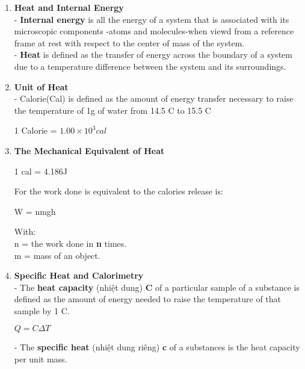 \documentclass[10pt]{article}
\begin{document}
\begin{enumerate}
	\item \textbf{Heat and Internal Energy}\\
	- \textbf{Internal energy} is all the energy of a system that is associated with its microscopic components -atoms and molecules-when viewd from a reference frame at rest with respect to the center of mass of the system.\\
	- \textbf{Heat} is defined as the transfer of energy across the boundary of a system due to a temperature difference between the system and its surroundings.\\
	\item \textbf{Unit of Heat}\\
	- Calorie(Cal) is defined as the amount of energy transfer necessary to raise the temperature of 1g of water from 14.5 \degree C to 15.5 \degree C
	\begin{mybox}
	\begin{center}
	1 Calorie = $1.00 \times 10^3 cal$
	\end{center}
	\end{mybox}
	\item \textbf{The Mechanical Equivalent of Heat}
	\begin{mybox}
	\begin{center}
	1 cal = 4.186J
	\end{center}
	\end{mybox}
	For the work done is equivalent to the calories release is:
	\begin{mybox}
	\begin{center}
	W = nmgh
	\end{center}
	\end{mybox}
	With:\\
	n = the work done in \textbf{n} times.\\
	m = mass of an object.\\
	\item \textbf{Specific Heat and Calorimetry}\\
	- The \textbf{heat capacity} (nhiệt dung) \textbf{C} of a particular sample of a substance is defined as the amount of energy needed to raise the temperature of that sample by 1 \degree C.
	\begin{mybox}
	\begin{center}
	$Q = C \Delta T$
	\end{center}
	\end{mybox}
	- The \textbf{specific heat} (nhiệt dung riêng) \textbf{c} of a substances is the heat capacity per unit mass.

\end{enumerate}
\end{document}
